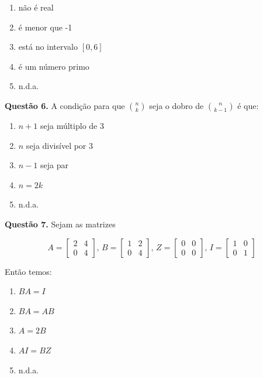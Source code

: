 \documentclass[11pt]{article}
\begin{document}
\begin{enumerate}[\bf A (\quad)]
    \item não é real
    \item é menor que -1
    \item está no intervalo $[0,6]$
    \item é um número primo
    \item n.d.a.
\end{enumerate}

\textbf{Questão 6.} A condição para que $\binom{n}{k}$ seja o dobro de $\binom{n}{k-1}$ é que:

\begin{multicols}{3}
    \begin{enumerate}[\bf A (\quad)]
        \item $n+1$ seja múltiplo de 3
        \item $n$ seja divisível por 3
        \item $n-1$ seja par
        \item $n=2k$
        \item n.d.a.
    \end{enumerate}
\end{multicols}

\textbf{Questão 7.} Sejam as matrizes

\[
A = 
\begin{bmatrix}
2 & 4\\
0 & 4
\end{bmatrix}, \,
B = 
\begin{bmatrix}
1 & 2\\
0 & 4
\end{bmatrix}, \,
Z =
\begin{bmatrix}
0 & 0\\
0 & 0
\end{bmatrix}, \,
I = 
\begin{bmatrix}
1 & 0\\
0 & 1
\end{bmatrix}
\]

Então temos:

\begin{multicols}{5}
\begin{enumerate}[\bf A (\quad)]
    \item $BA = I$
    \item $BA =AB$
    \item $A =2B$
    \item $AI = BZ$
    \item n.d.a.
\end{enumerate}
\end{multicols}
\end{document}
